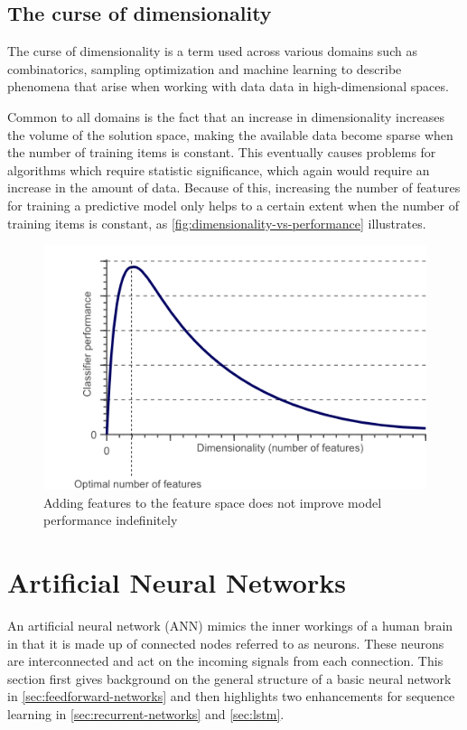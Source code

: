 \subsection{The curse of dimensionality}
The curse of dimensionality is a term used across various domains such as combinatorics, sampling optimization and machine learning to describe phenomena that arise when working with data data in high-dimensional spaces.

Common to all domains is the fact that an increase in dimensionality increases the volume of the solution space, making the available data become sparse when the number of training items is constant. This eventually causes problems for algorithms which require statistic significance, which again would require an increase in the amount of data.
Because of this, increasing the number of features for training a predictive model only helps to a certain extent when the number of training items is constant, as \autoref{fig:dimensionality-vs-performance} illustrates.

\begin{figure}
    \centering
    \includegraphics[width=.75\textwidth]{gfx/dimensionality_vs_performance.png}
    \caption[A visualization of the curse of dimensionality]{Adding features to the feature space does not improve model performance indefinitely}
    \label{fig:dimensionality-vs-performance}
\end{figure}

\section{Artificial Neural Networks}\label{sec:artificial-neural-networks}
An artificial neural network (ANN) mimics the inner workings of a human brain in that it is made up of connected nodes referred to as neurons. These neurons are interconnected and act on the incoming signals from each connection. This section first gives background on the general structure of a basic neural network in \autoref{sec:feedforward-networks} and then highlights two enhancements for sequence learning in \autoref{sec:recurrent-networks} and \autoref{sec:lstm}.


